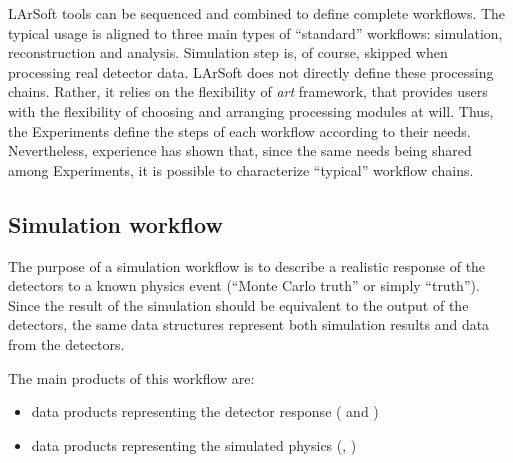 
LArSoft tools can be sequenced and combined to define complete workflows.
The typical usage is aligned to three main types of ``standard'' workflows: %
simulation, reconstruction and analysis.
Simulation step is, of course, skipped when processing real detector data.
LArSoft does not directly define these processing chains.
Rather, it relies on the flexibility of \emph{art} framework,
that provides users with the flexibility of choosing and arranging processing modules at will.
Thus, the Experiments define the steps of each workflow according to their needs.
Nevertheless, experience has shown that,
since the same needs being shared among Experiments,
it is possible to characterize ``typical'' workflow chains.


\subsection{Simulation workflow}
\label{ssec:Workflows:Simulation}

The purpose of a simulation workflow is to describe a realistic response of
the detectors to a known physics event (``Monte Carlo truth'' or simply ``truth'').
Since the result of the simulation should be equivalent to the output of the detectors,
the same data structures represent both simulation results and data from the detectors.

The main products of this workflow are:
\begin{itemize}
   \item data products representing the detector response (\eg {} and )
   \item data products representing the simulated physics (\eg {}, )
\end{itemize}

